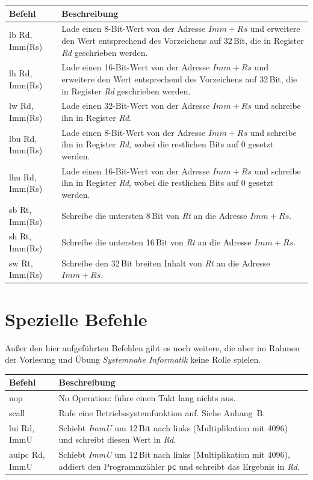 \documentclass[a4paper,11pt]{article}
\begin{document}
	\begin{center}
		\begin{tabular}{>{\ttfamily}lp{11cm}}
			\toprule
			\normalfont\textbf{Befehl} & \textbf{Beschreibung} \\
			\midrule
			lb  Rd, Imm(Rs) & Lade einen 8-Bit-Wert von der Adresse $Imm+Rs$ und erweitere den Wert entsprechend des Vorzeichens auf 32\,Bit, die in Register \textit{Rd} geschrieben werden. \\
			lh  Rd, Imm(Rs) & Lade einen 16-Bit-Wert von der Adresse $Imm+Rs$ und erweitere den Wert entsprechend des Vorzeichens auf 32\,Bit, die in Register \textit{Rd} geschrieben werden. \\
			lw  Rd, Imm(Rs) & Lade einen 32-Bit-Wert von der Adresse $Imm+Rs$ und schreibe ihn in Register \textit{Rd}. \\
			lbu Rd, Imm(Rs) & Lade einen 8-Bit-Wert von der Adresse $Imm+Rs$ und schreibe ihn in Register \textit{Rd}, wobei die restlichen Bits auf $0$ gesetzt werden. \\
			lhu Rd, Imm(Rs) & Lade einen 16-Bit-Wert von der Adresse $Imm+Rs$ und schreibe ihn in Register \textit{Rd}, wobei die restlichen Bits auf $0$ gesetzt werden. \\
			sb  Rt, Imm(Rs) & Schreibe die untersten 8\,Bit von \textit{Rt} an die Adresse $Imm+Rs$. \\
			sh  Rt, Imm(Rs) & Schreibe die untersten 16\,Bit von \textit{Rt} an die Adresse $Imm+Rs$. \\
			sw  Rt, Imm(Rs) & Schreibe den 32\,Bit breiten Inhalt von \textit{Rt} an die Adresse $Imm+Rs$. \\
			\bottomrule
		\end{tabular}
	\end{center}
	
	\section{Spezielle Befehle}
	
	Außer den hier aufgeführten Befehlen gibt es noch weitere, die aber im Rahmen der Vorlesung und Übung \textit{Systemnahe Informatik} keine Rolle spielen.
	
	\begin{center}
		\begin{tabular}{>{\ttfamily}lp{11cm}}
			\toprule
			\normalfont\textbf{Befehl} & \textbf{Beschreibung} \\
			\midrule
			nop          & No Operation: führe einen Takt lang nichts aus. \\
			scall        & Rufe eine Betriebssystemfunktion auf. Siehe Anhang~B. \\
			lui   Rd, ImmU & Schiebt \textit{ImmU} um 12\,Bit nach links (Multiplikation mit 4096) und schreibt diesen Wert in \textit{Rd}. \\
			auipc Rd, ImmU & Schiebt \textit{ImmU} um 12\,Bit nach links (Multiplikation mit 4096), addiert den Programmzähler \texttt{pc} und schreibt das Ergebnis in \textit{Rd}. \\
			\bottomrule
		\end{tabular}
	\end{center}
	
\end{document}
